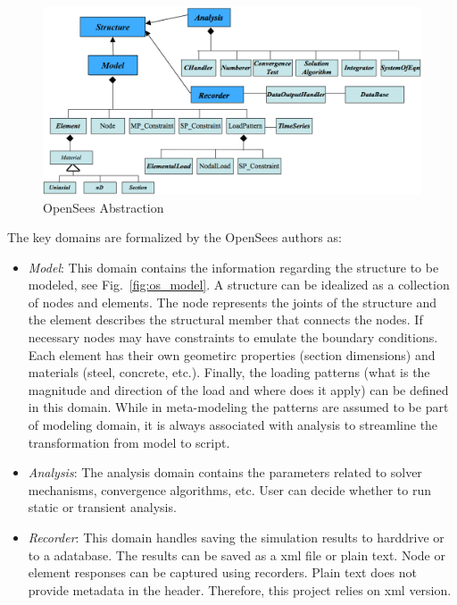 \documentclass[letterpaper]{article}
\begin{document}
	\begin{figure}[htbp]
		\includegraphics[scale=0.60]{domain.png}
		\centering
		\caption{OpenSees Abstraction}
		\label{fig:abstraction}%
	\end{figure}

	The key domains are formalized by the OpenSees authors as:
	\begin{itemize}
		\item \textit{Model}: This domain contains the information regarding the structure to be modeled, see Fig.~\ref{fig:os_model}. A structure can be idealized as a collection of nodes and elements. The node represents the joints of the structure and the element describes the structural member that connects the nodes. If necessary nodes may have constraints to emulate the boundary conditions. Each element has their own geometirc properties (section dimensions)  and materials (steel, concrete, etc.). Finally, the loading patterns (what is the magnitude and direction of the load and where does it apply) can be defined in this domain. While in meta-modeling the patterns are assumed to be part of modeling domain, it is always associated with analysis to streamline the transformation from model to script.
		\item \textit{Analysis}: The analysis domain contains the parameters related to solver mechanisms, convergence algorithms, etc. User can decide whether to run static or transient analysis.
		\item \textit{Recorder}: This domain handles saving the simulation results to harddrive or to a adatabase. The results can be saved as a xml file or plain text. Node or element responses can be captured using recorders. Plain text does not provide metadata in the header. Therefore, this project relies on xml version.
	\end{itemize}
\end{document}
